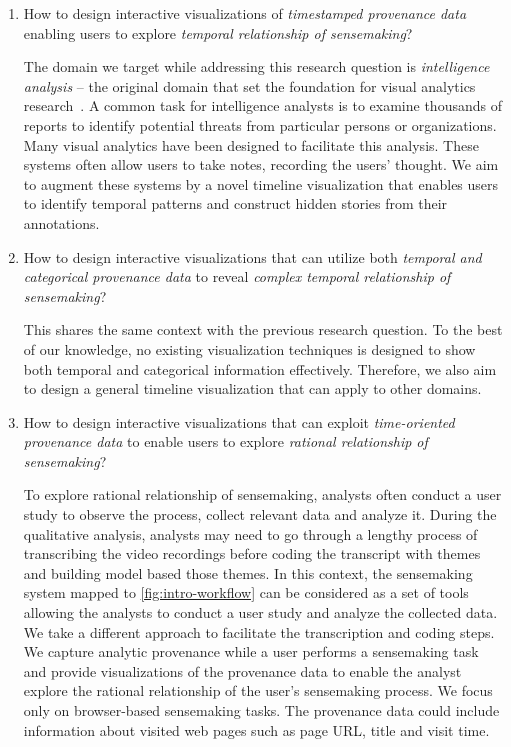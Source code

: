 \begin{enumerate}
	\item How to design interactive visualizations of \emph{timestamped provenance data} enabling users to explore \emph{temporal relationship of sensemaking}?
	
	The domain we target while addressing this research question is \emph{intelligence analysis} -- the original domain that set the foundation for visual analytics research~\cite{Thomas2005}. A common task for intelligence analysts is to examine thousands of reports to identify potential threats from particular persons or organizations. Many visual analytics have been designed to facilitate this analysis. These systems often allow users to take notes, recording the users' thought. We aim to augment these systems by a novel timeline visualization that enables users to identify temporal patterns and construct hidden stories from their annotations.
	
	\item How to design interactive visualizations that can utilize both \emph{temporal and categorical provenance data} to reveal \emph{complex temporal relationship of sensemaking}?	
	
	This shares the same context with the previous research question. To the best of our knowledge, no existing visualization techniques is designed to show both temporal and categorical information effectively. Therefore, we also aim to design a general timeline visualization that can apply to other domains.
	
	\item How to design interactive visualizations that can exploit \emph{time-oriented provenance data} to enable users to explore \emph{rational relationship of sensemaking}?
	
	To explore rational relationship of sensemaking, analysts often conduct a user study to observe the process, collect relevant data and analyze it. During the qualitative analysis, analysts may need to go through a lengthy process of transcribing the video recordings before coding the transcript with themes and building model based those themes. In this context, the sensemaking system mapped to \autoref{fig:intro-workflow} can be considered as a set of tools allowing the analysts to conduct a user study and analyze the collected data. We take a different approach to facilitate the transcription and coding steps. We capture analytic provenance while a user performs a sensemaking task and provide visualizations of the provenance data to enable the analyst explore the rational relationship of the user's sensemaking process. We focus only on browser-based sensemaking tasks. The provenance data could include information about visited web pages such as page URL, title and visit time.
	

\end{enumerate}
